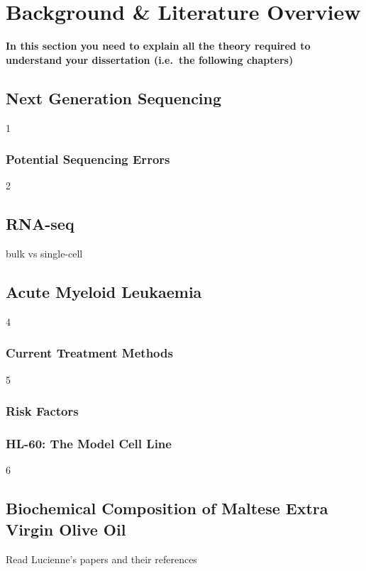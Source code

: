 \chapter{Background \& Literature Overview}
\textbf{In this section you need to explain all the theory required to understand your dissertation (i.e.\ the following chapters)}



\section{Next Generation Sequencing}
1
\subsection{Potential Sequencing Errors}
2

\section{RNA-seq}
bulk vs single-cell

\section{Acute Myeloid Leukaemia}
4

\subsection{Current Treatment Methods}
5

\subsection{Risk Factors}


\subsection{HL-60: The Model Cell Line }
6

\section{Biochemical Composition of Maltese Extra Virgin Olive Oil}
Read Lucienne's papers and their references

